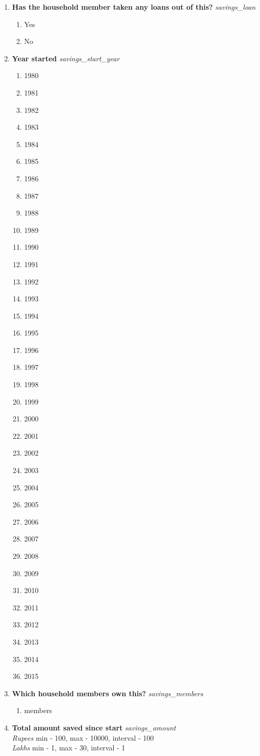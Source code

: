 \documentclass{article}
\begin{document}
\begin{enumerate}
\begin{enumerate}[label*=\arabic*.]
\item {\bfseries Has the household member taken any loans out of this?}\emph{ savings\_loan }
\begin{enumerate}
\item Yes
\item No
\end{enumerate}
\item {\bfseries Year started}\emph{ savings\_start\_year }
\begin{enumerate}
\item 1980
\item 1981
\item 1982
\item 1983
\item 1984
\item 1985
\item 1986
\item 1987
\item 1988
\item 1989
\item 1990
\item 1991
\item 1992
\item 1993
\item 1994
\item 1995
\item 1996
\item 1997
\item 1998
\item 1999
\item 2000
\item 2001
\item 2002
\item 2003
\item 2004
\item 2005
\item 2006
\item 2007
\item 2008
\item 2009
\item 2010
\item 2011
\item 2012
\item 2013
\item 2014
\item 2015
\end{enumerate}
\item {\bfseries Which household members own this?}\emph{ savings\_members }
\begin{enumerate}
\item members
\end{enumerate}
\item {\bfseries Total amount saved since start}\emph{ savings\_amount }
\\ \emph{ Rupees }min - 100, max - 10000, interval - 100
\\ \emph{ Lakhs }min - 1, max - 30, interval - 1


\end{enumerate}
\end{enumerate}
\end{document}
